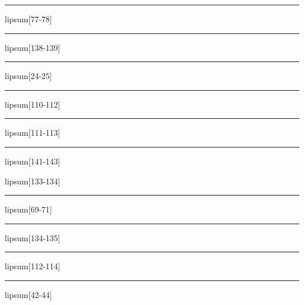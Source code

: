 \documentclass[11pt,a4paper]{article}
\begin{document}
\begin{simplewrap}
  \textcolor{red!42}{\rule{5.4cm}{7.3cm}}
\end{simplewrap}
lipsum[77-78]

\begin{simplewrap}
  \textcolor{olive!22}{\rule{4.5cm}{8.8cm}}
\end{simplewrap}
lipsum[138-139]

\begin{simplewrap}
  \textcolor{teal!13}{\rule{3.9cm}{6.6cm}}
\end{simplewrap}
lipsum[24-25]

\begin{simplewrap}
  \textcolor{orange!47}{\rule{4.0cm}{2.5cm}}
\end{simplewrap}
lipsum[110-112]

\begin{simplewrap}
  \textcolor{green!51}{\rule{5.5cm}{6.0cm}}
\end{simplewrap}
lipsum[111-113]

\begin{simplewrap}
  \textcolor{brown!22}{\rule{4.2cm}{4.0cm}}
\end{simplewrap}
lipsum[141-143]

lipsum[133-134]

\begin{simplewrap}
  \textcolor{cyan!46}{\rule{4.5cm}{7.3cm}}
\end{simplewrap}
lipsum[69-71]

\begin{simplewrap}
  \textcolor{magenta!49}{\rule{5.6cm}{9.3cm}}
\end{simplewrap}
lipsum[134-135]

\begin{simplewrap}
  \textcolor{blue!19}{\rule{3.7cm}{8.0cm}}
\end{simplewrap}
lipsum[112-114]

\begin{simplewrap}
  \textcolor{green!50}{\rule{3.6cm}{5.3cm}}
\end{simplewrap}
lipsum[42-44]
\end{document}
